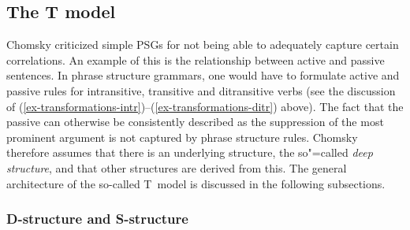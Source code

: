 \subsection{The T model}
\label{Abschnitt-T-Modell}

Chomsky
criticized simple PSGs for not being able to adequately capture certain correlations. An example of this is the relationship between
active and passive sentences. In phrase structure grammars, one would have to formulate active and passive rules for intransitive,
transitive and ditransitive verbs (see the discussion of
(\ref{ex-transformations-intr})--(\ref{ex-transformations-ditr}) above). The fact that the passive
can otherwise be consistently described as the suppression of the most prominent argument is not
captured by phrase structure rules. Chomsky therefore assumes that there is an underlying structure,
the so"=called \emph{deep structure}, and that
other structures are derived from this.  The general architecture of the so-called T~model is discussed in the following subsections.

\subsubsection{D-structure and S-structure}

